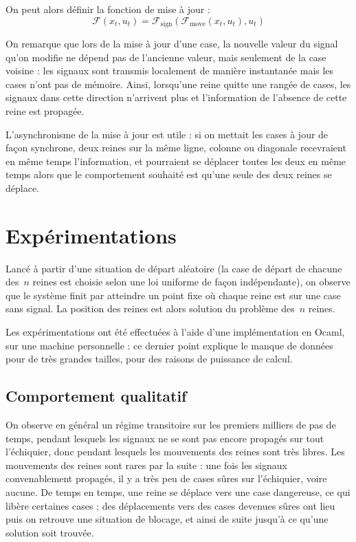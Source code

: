 \noindent
On peut alors définir la fonction de mise à jour : $$\mathcal{F}(x_t, u_t) = \mathcal{F}_{\mathrm{sign}}(\mathcal{F}_{\mathrm{move}}(x_t, u_t), u_t)$$


On remarque que lors de la mise à jour d'une case, la nouvelle valeur du signal qu'on modifie ne dépend pas de l'ancienne valeur, mais seulement de la case voisine : les signaux sont transmis localement de manière instantanée mais les cases n'ont pas de mémoire. Ainsi, lorsqu'une reine quitte une rangée de cases, les signaux dans cette direction n'arrivent plus et l'information de l'absence de cette reine est propagée. 

L'asynchronisme de la mise à jour est utile : si on mettait les cases à jour de façon synchrone, deux reines sur la même ligne, colonne ou diagonale recevraient en même temps l'information, et pourraient se déplacer toutes les deux en même temps alors que le comportement souhaité est qu'une seule des deux reines se déplace. 










\section{Expérimentations}


Lancé à partir d'une situation de départ aléatoire (la case de départ de chacune des~$n$ reines est choisie selon une loi uniforme de façon indépendante), on observe que le système finit par atteindre un point fixe où chaque reine est sur une case sans signal. La position des reines est alors solution du problème des~$n$ reines.

Les expérimentations ont été effectuées à l'aide d'une implémentation en Ocaml, sur une machine personnelle : ce dernier point explique le manque de données pour de très grandes tailles, pour des raisons de puissance de calcul.

\subsection{Comportement qualitatif}

On observe en général un régime transitoire sur les premiers milliers de pas de temps, pendant lesquels les signaux ne se sont pas encore propagés sur tout l'échiquier, donc pendant lesquels les mouvements des reines sont très libres. %
Les mouvements des reines sont rares par la suite : une fois les signaux convenablement propagés, il y a très peu de cases sûres sur l'échiquier, voire aucune. De temps en temps, une reine se déplace vers une case dangereuse, ce qui libère certaines cases ; des déplacements vers des cases devenues sûres ont lieu puis on retrouve une situation de blocage, et ainsi de suite jusqu'à ce qu'une solution soit trouvée.

